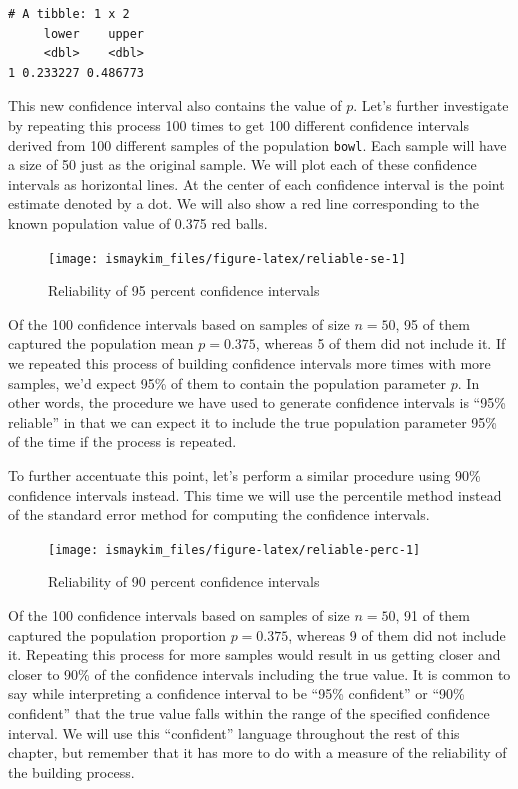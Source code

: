 \documentclass[12pt, krantz2,]{krantz}
\begin{document}
\begin{verbatim}
# A tibble: 1 x 2
     lower    upper
     <dbl>    <dbl>
1 0.233227 0.486773
\end{verbatim}

This new confidence interval also contains the value of \(p\). Let's further investigate by repeating this process 100 times to get 100 different confidence intervals derived from 100 different samples of the population \texttt{bowl}. Each sample will have a size of 50 just as the original sample. We will plot each of these confidence intervals as horizontal lines. At the center of each confidence interval is the point estimate denoted by a dot. We will also show a red line corresponding to the known population value of 0.375 red balls.

\begin{figure}

{\centering \texttt{[image: ismaykim\_files/figure-latex/reliable-se-1]} 

}

\caption{Reliability of 95 percent confidence intervals}\label{fig:reliable-se}
\end{figure}

Of the 100 confidence intervals based on samples of size \(n = 50\), 95 of them captured the population mean \(p = 0.375\), whereas 5 of them did not include it. If we repeated this process of building confidence intervals more times with more samples, we'd expect 95\% of them to contain the population parameter \(p\). In other words, the procedure we have used to generate confidence intervals is ``95\% reliable'' in that we can expect it to include the true population parameter 95\% of the time if the process is repeated.

To further accentuate this point, let's perform a similar procedure using 90\% confidence intervals instead. This time we will use the percentile method instead of the standard error method for computing the confidence intervals.

\begin{figure}

{\centering \texttt{[image: ismaykim\_files/figure-latex/reliable-perc-1]} 

}

\caption{Reliability of 90 percent confidence intervals}\label{fig:reliable-perc}
\end{figure}

Of the 100 confidence intervals based on samples of size \(n = 50\), 91 of them captured the population proportion \(p = 0.375\), whereas 9 of them did not include it. Repeating this process for more samples would result in us getting closer and closer to 90\% of the confidence intervals including the true value. It is common to say while interpreting a confidence interval to be ``95\% confident'' or ``90\% confident'' that the true value falls within the range of the specified confidence interval. We will use this ``confident'' language throughout the rest of this chapter, but remember that it has more to do with a measure of the reliability of the building process.
\end{document}
